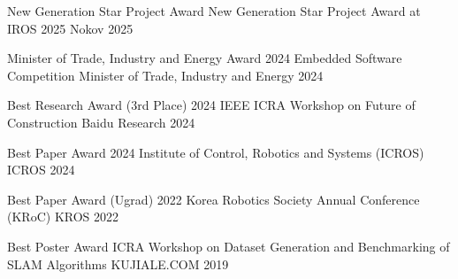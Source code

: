 \begin{cvhonors}
  \cvhonor
    {New Generation Star Project Award} %
    {New Generation Star Project Award at IROS 2025} %
    {Nokov} %
    {2025} %

  \cvhonor
    {Minister of Trade, Industry and Energy Award} %
    {2024  Embedded Software Competition} %
    {Minister of Trade, Industry and Energy} %
    {2024} %

  \cvhonor
    {Best Research Award (3rd Place)} %
    {2024  IEEE ICRA Workshop on Future of Construction} %
    {Baidu Research} %
    {2024} %

  \cvhonor
    {Best Paper Award} %
    {2024 Institute of Control, Robotics and Systems (ICROS)} %
    {ICROS} %
    {2024} %


  \cvhonor
    {Best Paper Award (Ugrad)} %
    {2022 Korea Robotics Society Annual Conference (KRoC)} %
    {KROS} %
    {2022} %

  \cvhonor
    {Best Poster Award} %
    {ICRA Workshop on Dataset Generation and Benchmarking of SLAM Algorithms} %
    {KUJIALE.COM} %
    {2019} %


\end{cvhonors}
